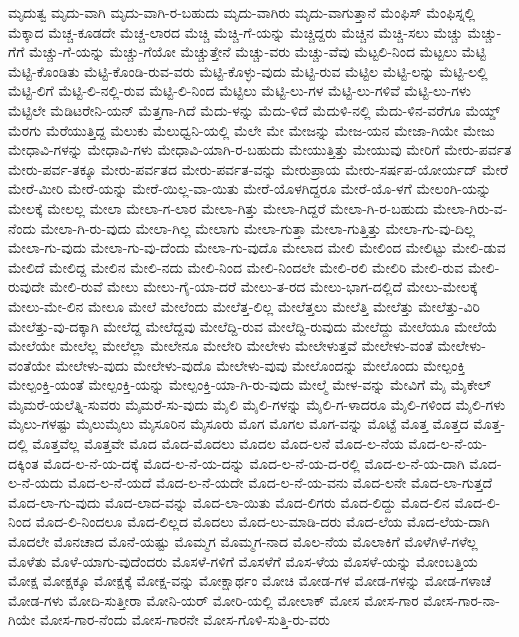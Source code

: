 {ಮೃದುತ್ವ
ಮೃದು-ವಾಗಿ
ಮೃದು-ವಾಗಿ-ರ-ಬಹುದು
ಮೃದು-ವಾಗಿರು
ಮೃದು-ವಾಗುತ್ತಾನೆ
ಮೆಂಫಿಸ್
ಮೆಂಫಿಸ್ನಲ್ಲಿ
ಮೆಕ್ಕಾದ
ಮೆಚ್ಚ-ಕೂಡದೇ
ಮೆಚ್ಚ-ಲಾರದ
ಮೆಚ್ಚಿ
ಮೆಚ್ಚಿ-ಗೆ-ಯನ್ನು
ಮೆಚ್ಚಿದ್ದರು
ಮೆಚ್ಚಿನ
ಮೆಚ್ಚಿ-ಸಲು
ಮೆಚ್ಚು
ಮೆಚ್ಚು-ಗೆಗೆ
ಮೆಚ್ಚು-ಗೆ-ಯನ್ನು
ಮೆಚ್ಚು-ಗೆಯೋ
ಮೆಚ್ಚುತ್ತೇನೆ
ಮೆಚ್ಚು-ವರು
ಮೆಚ್ಚು-ವೆವು
ಮೆಟ್ಟಲಿ-ನಿಂದ
ಮೆಟ್ಟಲು
ಮೆಟ್ಟಿ
ಮೆಟ್ಟಿ-ಕೊಂಡಿತು
ಮೆಟ್ಟಿ-ಕೊಂಡಿ-ರುವ-ವರು
ಮೆಟ್ಟಿ-ಕೊಳ್ಳು-ವುದು
ಮೆಟ್ಟಿ-ರುವ
ಮೆಟ್ಟಿಲ
ಮೆಟ್ಟಿ-ಲನ್ನು
ಮೆಟ್ಟಿ-ಲಲ್ಲಿ
ಮೆಟ್ಟಿ-ಲಿಗೆ
ಮೆಟ್ಟಿ-ಲಿ-ನಲ್ಲಿ-ರುವ
ಮೆಟ್ಟಿ-ಲಿ-ನಿಂದ
ಮೆಟ್ಟಿಲು
ಮೆಟ್ಟಿ-ಲು-ಗಳ
ಮೆಟ್ಟಿ-ಲು-ಗಳಿವೆ
ಮೆಟ್ಟಿ-ಲು-ಗಳು
ಮೆಟ್ಟಿಲೇ
ಮೆಡಿಟರೇನಿ-ಯನ್
ಮೆತ್ತಗಾ-ಗಿದೆ
ಮೆದು-ಳನ್ನು
ಮೆದು-ಳಿದೆ
ಮೆದುಳಿ-ನಲ್ಲಿ
ಮೆದು-ಳಿನ-ವರೆಗೂ
ಮೆಯ್ಡ್
ಮೆರಗು
ಮೆರೆಯುತ್ತಿದ್ದ
ಮೆಲುಕು
ಮೆಲುಧ್ವನಿ-ಯಲ್ಲಿ
ಮೆಲೇ
ಮೇ
ಮೇಜನ್ನು
ಮೇಜ-ಯನ
ಮೇಜಾ-ಗಿಯೇ
ಮೇಜು
ಮೇಧಾವಿ-ಗಳನ್ನು
ಮೇಧಾವಿ-ಗಳು
ಮೇಧಾವಿ-ಯಾಗಿ-ರ-ಬಹುದು
ಮೇಯುತ್ತಿತ್ತು
ಮೇಯುವು
ಮೇರಿಗೆ
ಮೇರು-ಪರ್ವತ
ಮೇರು-ಪರ್ವ-ತಕ್ಕೂ
ಮೇರು-ಪರ್ವತದ
ಮೇರು-ಪರ್ವತ-ವನ್ನು
ಮೇರುಪ್ರಾಯ
ಮೇರು-ಸರ್ಷಪ-ಯೋರ್ಯದ್
ಮೇರೆ
ಮೇರೆ-ಮೀರಿ
ಮೇರೆ-ಯನ್ನು
ಮೇರೆ-ಯಿಲ್ಲ-ವಾ-ಯಿತು
ಮೇರೆ-ಯೊಳಗಿದ್ದರೂ
ಮೇರೆ-ಯೊ-ಳಗೆ
ಮೇಲಂಗಿ-ಯನ್ನು
ಮೇಲಕ್ಕೆ
ಮೇಲಲ್ಲ
ಮೇಲಾ
ಮೇಲಾ-ಗ-ಲಾರ
ಮೇಲಾ-ಗಿತ್ತು
ಮೇಲಾ-ಗಿದ್ದರೆ
ಮೇಲಾ-ಗಿ-ರ-ಬಹುದು
ಮೇಲಾ-ಗಿರು-ವ-ನೆಂದು
ಮೇಲಾ-ಗಿ-ರು-ವುದು
ಮೇಲಾ-ಗಿಲ್ಲ
ಮೇಲಾಗು
ಮೇಲಾ-ಗುತ್ತಾ
ಮೇಲಾ-ಗುತ್ತಿತ್ತು
ಮೇಲಾ-ಗು-ವು-ದಿಲ್ಲ
ಮೇಲಾ-ಗು-ವುದು
ಮೇಲಾ-ಗು-ವು-ದೆಂದು
ಮೇಲಾ-ಗು-ವುದೊ
ಮೇಲಾದ
ಮೇಲಿ
ಮೇಲಿಂದ
ಮೇಲಿಟ್ಟು
ಮೇಲಿ-ಡುವ
ಮೇಲಿದೆ
ಮೇಲಿದ್ದ
ಮೇಲಿನ
ಮೇಲಿ-ನದು
ಮೇಲಿ-ನಿಂದ
ಮೇಲಿ-ನಿಂದಲೇ
ಮೇಲಿ-ರಲಿ
ಮೇಲಿರಿ
ಮೇಲಿ-ರುವ
ಮೇಲಿ-ರುವುದೇ
ಮೇಲಿ-ರುವೆ
ಮೇಲು
ಮೇಲು-ಗೈ-ಯಾ-ದರೆ
ಮೇಲು-ತ-ರದ
ಮೇಲು-ಭಾಗ-ದಲ್ಲಿದೆ
ಮೇಲು-ಮೇಲಕ್ಕೆ
ಮೇಲು-ಮೇ-ಲಿನ
ಮೇಲೂ
ಮೇಲೆ
ಮೇಲೆಂದು
ಮೇಲೆತ್ತ-ಲಿಲ್ಲ
ಮೇಲೆತ್ತಲು
ಮೇಲೆತ್ತಿ
ಮೇಲೆತ್ತು
ಮೇಲೆತ್ತು-ವಿರಿ
ಮೇಲೆತ್ತು-ವು-ದಕ್ಕಾಗಿ
ಮೇಲೆದ್ದ
ಮೇಲೆದ್ದವು
ಮೇಲೆದ್ದಿ-ರುವ
ಮೇಲೆದ್ದಿ-ರುವುದು
ಮೇಲೆದ್ದು
ಮೇಲೆಯೂ
ಮೇಲೆಯೆ
ಮೇಲೆಯೇ
ಮೇಲೆಲ್ಲ
ಮೇಲೆಲ್ಲಾ
ಮೇಲೇನೂ
ಮೇಲೇರಿ
ಮೇಲೇಳು
ಮೇಲೇಳುತ್ತವೆ
ಮೇಲೇಳು-ವಂತೆ
ಮೇಲೇಳು-ವಂತೆಯೇ
ಮೇಲೇಳು-ವುದು
ಮೇಲೇಳು-ವುದೊ
ಮೇಲೇಳು-ವುವು
ಮೇಲೊಂದನ್ನು
ಮೇಲೊಂದು
ಮೇಲ್ಪಂಕ್ತಿ
ಮೇಲ್ಪಂಕ್ತಿ-ಯಂತೆ
ಮೇಲ್ಪಂಕ್ತಿ-ಯನ್ನು
ಮೇಲ್ಪಂಕ್ತಿ-ಯಾ-ಗಿ-ರು-ವುದು
ಮೇಲ್ಮೆ
ಮೇಳ-ವನ್ನು
ಮೇವಿಗೆ
ಮೈ
ಮೈಕೇಲ್
ಮೈಮರೆ-ಯಲೆತ್ನಿ-ಸುವರು
ಮೈಮರೆ-ಸು-ವುದು
ಮೈಲಿ
ಮೈಲಿ-ಗಳನ್ನು
ಮೈಲಿ-ಗ-ಳಾದರೂ
ಮೈಲಿ-ಗಳಿಂದ
ಮೈಲಿ-ಗಳು
ಮೈಲು-ಗಳಷ್ಟು
ಮೈಲುಮೈಲು
ಮೈಸೂರಿನ
ಮೈಸೂರು
ಮೊಗ
ಮೊಗಲ
ಮೊಗ-ವನ್ನು
ಮೊಟ್ಟೆ
ಮೊತ್ತ
ಮೊತ್ತದ
ಮೊತ್ತ-ದಲ್ಲಿ
ಮೊತ್ತವೆಲ್ಲ
ಮೊತ್ತವೇ
ಮೊದ
ಮೊದ-ಮೊದಲು
ಮೊದಲ
ಮೊದ-ಲನೆ
ಮೊದ-ಲ-ನೆಯ
ಮೊದ-ಲ-ನೆ-ಯ-ದಕ್ಕಿಂತ
ಮೊದ-ಲ-ನೆ-ಯ-ದಕ್ಕೆ
ಮೊದ-ಲ-ನೆ-ಯ-ದನ್ನು
ಮೊದ-ಲ-ನೆ-ಯ-ದ-ರಲ್ಲಿ
ಮೊದ-ಲ-ನೆ-ಯ-ದಾಗಿ
ಮೊದ-ಲ-ನೆ-ಯದು
ಮೊದ-ಲ-ನೆ-ಯದೆ
ಮೊದ-ಲ-ನೆ-ಯದೇ
ಮೊದ-ಲ-ನೆ-ಯ-ವನು
ಮೊದ-ಲನೇ
ಮೊದ-ಲಾ-ಗುತ್ತದೆ
ಮೊದ-ಲಾ-ಗು-ವುದು
ಮೊದ-ಲಾದ-ವನ್ನು
ಮೊದ-ಲಾ-ಯಿತು
ಮೊದ-ಲಿಗರು
ಮೊದ-ಲಿದ್ದು
ಮೊದ-ಲಿನ
ಮೊದ-ಲಿ-ನಿಂದ
ಮೊದ-ಲಿ-ನಿಂದಲೂ
ಮೊದ-ಲಿಲ್ಲದ
ಮೊದಲು
ಮೊದ-ಲು-ಮಾಡಿ-ದರು
ಮೊದ-ಲೆಯ
ಮೊದ-ಲೆಯ-ದಾಗಿ
ಮೊದಲೇ
ಮೊನಚಾದ
ಮೊನೆ-ಯಷ್ಟು
ಮೊಮ್ಮಗ
ಮೊಮ್ಮಗ-ನಾದ
ಮೊಲ-ನೆಯ
ಮೊಲಾಕಿಗೆ
ಮೊಳೆಗಿಳೆ-ಗಳೆಲ್ಲ
ಮೊಳೆತು
ಮೊಳೆ-ಯಾಗು-ವುದೆಂದರು
ಮೊಸಳೆ-ಗಳಿಗೆ
ಮೊಸಳೆಗೆ
ಮೊಸ-ಳೆಯ
ಮೊಸಳೆ-ಯನ್ನು
ಮೋಂಬತ್ತಿಯ
ಮೋಕ್ಷ
ಮೋಕ್ಷಕ್ಕೂ
ಮೋಕ್ಷಕ್ಕೆ
ಮೋಕ್ಷ-ವನ್ನು
ಮೋಕ್ಷಾರ್ಥಂ
ಮೋಚಿ
ಮೋಡ-ಗಳ
ಮೋಡ-ಗಳನ್ನು
ಮೋಡ-ಗಳಾಚೆ
ಮೋಡ-ಗಳು
ಮೋದಿ-ಸುತ್ತೀರಾ
ಮೋನಿ-ಯರ್
ಮೋರಿ-ಯಲ್ಲಿ
ಮೋಲಾಕ್
ಮೋಸ
ಮೋಸ-ಗಾರ
ಮೋಸ-ಗಾರ-ನಾ-ಗಿಯೇ
ಮೋಸ-ಗಾರ-ನೆಂದು
ಮೋಸ-ಗಾರನೇ
ಮೋಸ-ಗೊಳಿ-ಸುತ್ತಿ-ರು-ವರು
}
